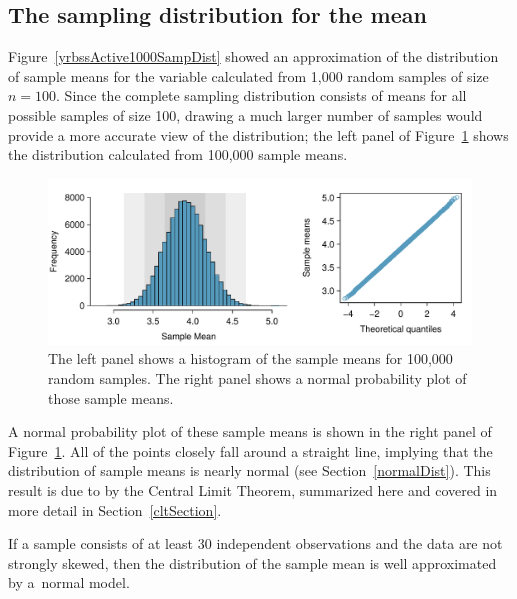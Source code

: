 \begin{spacing}{1.5}
\subsection{The sampling distribution for the mean}

 Figure~\ref{yrbssActive1000SampDist} showed an approximation of the distribution of sample means for the variable  calculated from 1,000 random samples of size $n= 100$. Since the complete sampling distribution consists of means for all possible samples of size 100, drawing a much larger number of samples would provide a more accurate view of the distribution; the left panel of Figure~\ref{yrbssActiveBigSampDist} shows the distribution calculated from 100,000 sample means. 

\begin{figure}[hht]
   \centering
   \includegraphics[width=\textwidth]
{ch_inference_foundations_oi_biostat/figures/yrbssActiveBigSampDist/yrbssActiveBigSampDist}
   \caption{The left panel shows a histogram of the sample means for 100,000 random samples. The right panel shows a normal probability plot of those sample means.}
   \label{yrbssActiveBigSampDist}
\end{figure}

A normal probability plot of these sample means is shown in the right panel of Figure~\ref{yrbssActiveBigSampDist}. All of the points closely fall around a straight line, implying that the distribution of sample means is nearly normal (see Section~\ref{normalDist}). This result is due to by the Central Limit Theorem, summarized here and covered in more detail in Section~\ref{cltSection}.

\begin{termBox}{
If a sample consists of at least 30 independent observations and the data are not strongly skewed, then the distribution of the sample mean is well approximated by a~normal model.}
\end{termBox}


\end{spacing}
